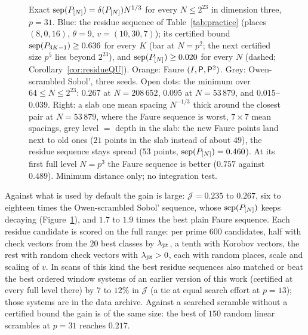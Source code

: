 \begin{figure}[t]
\centering
{}
\caption{Exact $\operatorname{sep}(P_{[N]})=\delta(P_{[N]})N^{1/3}$ for every $N\le2^{23}$ in dimension three, $p=31$. Blue: the residue sequence of Table~\ref{tab:practice} (places $(8,0,16)$, $\theta=9$, $v=(10,30,7)$); its certified bound $\operatorname{sep}(P_{3K-1})\ge0.636$ for every $K$ (bar at $N=p^2$; the next certified size $p^5$ lies beyond $2^{23}$), and $\operatorname{sep}(P_{[N]})\ge0.020$ for every $N$ (dashed; Corollary~\ref{cor:residueQU}). Orange: Faure $(I,\mathsf{P},\mathsf{P}^2)$. Grey: Owen-scrambled Sobol', three seeds. Open dots: the minimum over $64\le N\le2^{23}$: $0.267$ at $N=208\,652$, $0.095$ at $N=53\,879$, and $0.015$--$0.039$. Right: a slab one mean spacing $N^{-1/3}$ thick around the closest pair at $N=53\,879$, where the Faure sequence is worst, $7\times7$ mean spacings, grey level $=$ depth in the slab: the new Faure points land next to old ones ($21$ points in the slab instead of about $49$), the residue sequence stays spread ($53$ points, $\operatorname{sep}(P_{[N]})=0.460$). At its first full level $N=p^3$ the Faure sequence is better ($0.757$ against $0.489$). Minimum distance only; no integration test.} %
\label{fig:evidence}
\end{figure}

Against what is used by default the gain is large: $\mathcal J=0.235$ to $0.267$, six to eighteen times the Owen-scrambled Sobol' sequence, whose $\operatorname{sep}(P_{[N]})$ keeps decaying (Figure~\ref{fig:evidence}), and $1.7$ to $1.9$ times the best plain Faure sequence. Each residue candidate is scored on the full range: per prime $600$ candidates, half with check vectors from the $20$ best classes by $\lambda_{\mathrm{jit}}$, a tenth with Korobov vectors, the rest with random check vectors with $\lambda_{\mathrm{jit}}>0$, each with random places, scale and scaling of $v$. In scans of this kind the best residue sequences also matched or beat the best ordered window systems of an earlier version of this work (certified at every full level there) by $7$ to $12\%$ in $\mathcal J$ (a tie at equal search effort at $p=13$); those systems are in the data archive. Against a searched scramble without a certified bound the gain is of the same size: the best of $150$ random linear scrambles at $p=31$ reaches $0.217$.

